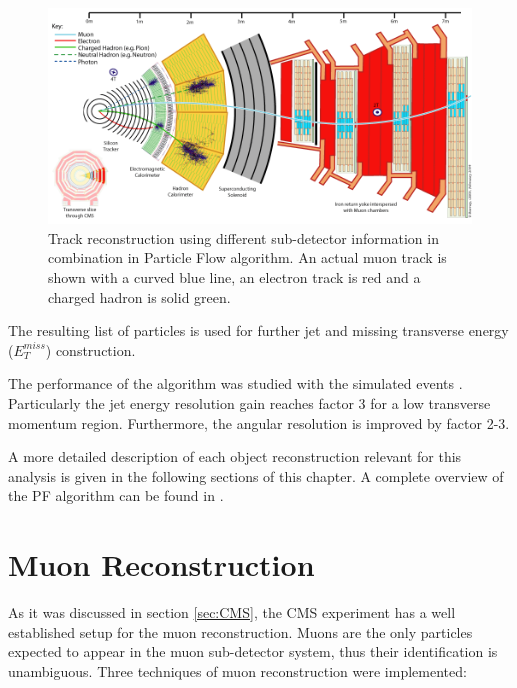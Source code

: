 \begin{figure}[t]
  \centering
  \includegraphics[width=1.0\textwidth]{04_event_reconstruction/plots/CMS_Slice.png}
  \caption{Track reconstruction using different sub-detector information in combination in Particle Flow algorithm. An actual
  muon track is shown with a curved blue line, an electron track is red and a charged hadron is solid green.}
  \label{fig:PFmuons}
\end{figure}

The resulting list of particles is used for further jet and missing transverse energy ($E_{T}^{miss}$) construction. 

The performance of the algorithm was studied with the simulated events \cite{CMS-PAS-PFT-09-001}. Particularly the jet energy
resolution gain reaches factor 3 for a low transverse momentum region. Furthermore, the angular resolution is improved by factor 2-3.

A more detailed description of each object reconstruction relevant for this analysis is given in the following sections of this chapter.
A complete overview of the PF algorithm can be found in \cite{CMS-PAS-PFT-09-001}. 

\section{Muon Reconstruction}

As it was discussed in section \ref{sec:CMS}, the CMS experiment has a well established setup for the muon reconstruction.
Muons are the only particles expected to appear in the muon sub-detector system, thus their identification is unambiguous.
Three techniques of muon reconstruction were implemented:


